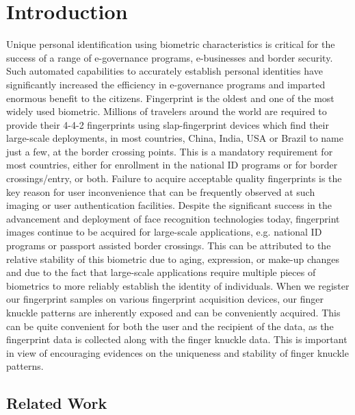 \hiddenref{}

\section{Introduction\label{introduction}}

Unique personal identification using biometric characteristics is critical for the success of a range of e-governance programs, e-businesses and border security. Such automated capabilities to accurately establish personal identities have significantly increased the efficiency in e-governance programs and imparted enormous benefit to the citizens. Fingerprint is the oldest and one of the most widely used biometric. Millions of travelers around the world are required to provide their 4-4-2 fingerprints using slap-fingerprint devices which find their large-scale deployments, in most countries, China, India, USA or Brazil to name just a few, at the border crossing points. This is a mandatory requirement for most countries, either for enrollment in the national ID programs or for border crossings/entry, or both. Failure to acquire acceptable quality fingerprints is the key reason for user inconvenience that can be frequently observed at such imaging or user authentication facilities. Despite the significant success in the advancement and deployment of face recognition technologies today, fingerprint images continue to be acquired for large-scale applications, e.g. national ID programs or passport assisted border crossings. This can be attributed to the relative stability of this biometric due to aging, expression, or make-up changes and due to the fact that large-scale applications require multiple pieces of biometrics to more reliably establish the identity of individuals. When we register our fingerprint samples on various fingerprint acquisition devices, our finger knuckle patterns are inherently exposed and can be conveniently acquired. This can be quite convenient for both the user and the recipient of the data, as the fingerprint data is collected along with the finger knuckle data. This is important in view of encouraging evidences on the uniqueness \cite{cappelli2010minutia} and stability \cite{kumar2014importance} of finger knuckle patterns.

\subsection{Related Work\label{relate-work}}
